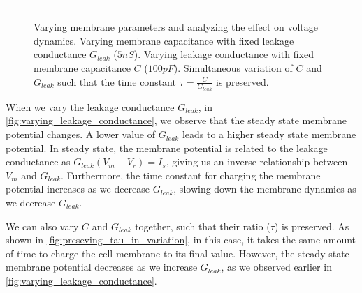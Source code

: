 \documentclass[10pt,onecolumn]{article}
\begin{document}
\begin{figure}[H]
\begin{tabular}{p{}p{}p{}}
{            }
        \end{tabular}
        \caption{\label{fig:cg_variation}
        Varying membrane parameters and analyzing the effect on voltage dynamics.
        \protect{} Varying membrane capacitance with fixed leakage conductance $G_{leak}$ ($5nS$).
        \protect{} Varying leakage conductance with fixed membrane capacitance $C$ ($100pF$).
        \protect{} Simultaneous variation of $C$ and $G_{leak}$ such that the time constant $\tau=\frac{C}{G_{leak}}$ is preserved.
        }
    \end{figure}
    When we vary the leakage conductance $G_{leak}$, in \cref{fig:varying_leakage_conductance}, we observe that the steady state membrane potential changes.
    A lower value of $G_{leak}$ leads to a higher steady state membrane potential.
    In steady state, the membrane potential is related to the leakage conductance as $G_{leak}(V_{m} - V_{r}) = I_{s}$, giving us an inverse relationship between $V_{m}$ and $G_{leak}$.
    Furthermore, the time constant for charging the membrane potential increases as we decrease $G_{leak}$, slowing down the membrane dynamics as we decrease $G_{leak}$.

    We can also vary $C$ and $G_{leak}$ together, such that their ratio ($\tau$) is preserved.
    As shown in \cref{fig:preseving_tau_in_variation}, in this case, it takes the same amount of time to charge the cell membrane to its final value.
    However, the steady-state membrane potential decreases as we increase $G_{leak}$, as we observed earlier in \cref{fig:varying_leakage_conductance}.
\end{document}
